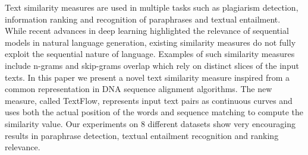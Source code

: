Text similarity measures are used in multiple tasks such as plagiarism detection, information ranking and recognition of paraphrases and textual entailment. While recent advances in deep learning highlighted the relevance of sequential models in natural language generation, existing similarity measures do not fully exploit the sequential nature of language. Examples of such similarity measures include n-grams and skip-grams overlap which rely on distinct slices of the input texts. In this paper we present a novel text similarity measure inspired from a common representation in DNA sequence alignment algorithms. The new measure, called TextFlow, represents input text pairs as continuous curves and uses both the actual position of the words and sequence matching to compute the similarity value. Our experiments on 8 different datasets show very encouraging results in paraphrase detection, textual entailment recognition and ranking relevance.
